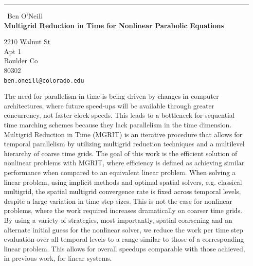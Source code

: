 \documentclass{report}
\begin{document}
\begin{center}
\rule{6in}{1pt} \
{\large Ben O'Neill \\
{\bf Multigrid Reduction in Time for Nonlinear Parabolic Equations }}

2210 Walnut St \\ Apt 1 \\ Boulder Co \\ 80302
\\
{\tt ben.oneill@colorado.edu}\end{center}

The need for parallelism in time is being driven by changes in computer
architectures, where future speed-ups will be available through greater
concurrency, not faster clock speeds. This leads to a bottleneck for
sequential time marching schemes because they lack parallelism in the
time dimension. Multigrid Reduction in Time (MGRIT) is an iterative
procedure that allows for temporal parallelism by utilizing multigrid
reduction techniques and a multilevel hierarchy of coarse time grids. The
goal of this work is the efficient solution of nonlinear problems with
MGRIT, where efficiency is defined as achieving similar performance when
compared to an equivalent linear problem. When solving a linear problem,
using implicit methods and optimal spatial solvers, e.g. classical
multigrid, the spatial multigrid convergence rate is fixed across
temporal levels, despite a large variation in time step sizes. This is
not the case for nonlinear problems, where the work required increases
dramatically on coarser time grids. By using a variety of strategies,
most importantly, spatial coarsening and an alternate initial guess for
the nonlinear solver, we reduce the work per time step evaluation over
all temporal levels to a range similar to those of a corresponding linear
problem. This allows for overall speedups comparable with those achieved,
in previous work, for linear systems.
\end{document}
